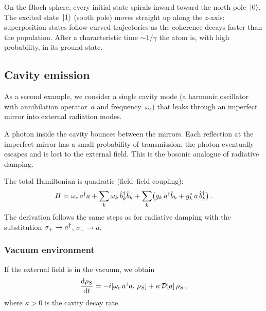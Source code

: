 \begin{intuition}
  On the Bloch sphere, every initial state spirals inward toward the
  north pole~$\lvert 0 \rangle$.  The excited state~$\lvert 1 \rangle$ (south pole)
  moves straight up along the $z$-axis; superposition states follow
  curved trajectories as the coherence decays faster than the
  population.  After a characteristic time $\sim 1/\gamma$ the atom
  is, with high probability, in its ground state.
\end{intuition}

\subsection{Cavity emission}%
\label{sec:cavity-emission}

As a second example, we consider a single cavity mode (a harmonic
oscillator with annihilation operator~$a$ and frequency~$\omega_c$)
that leaks through an imperfect mirror into external radiation modes.

\begin{intuition}
  A photon inside the cavity bounces between the mirrors.  Each
  reflection at the imperfect mirror has a small probability of
  transmission; the photon eventually escapes and is lost to the
  external field.  This is the bosonic analogue of radiative damping.
\end{intuition}

The total Hamiltonian is quadratic (field--field coupling):
\begin{equation}\label{eq:cavity-hamiltonian}
  H = \omega_c\, a^\dagger a
    + \sum_k \omega_k\, \hat{b}_k^\dagger \hat{b}_k
    + \sum_k \bigl(g_k\, a^\dagger \hat{b}_k + g_k^*\, a\, \hat{b}_k^\dagger\bigr)\,.
\end{equation}
The derivation follows the same steps as for radiative damping with
the substitution $\sigma_+ \to a^\dagger$, $\sigma_- \to a$.

\subsubsection{Vacuum environment}

If the external field is in the vacuum, we obtain
\begin{equation}\label{eq:lindblad-cavity-vac}
  \frac{\mathrm{d}\rho_S}{\mathrm{d} t}
  = -i[\omega_c\, a^\dagger a,\,\rho_S]
    + \kappa\,\mathcal{D}[a]\,\rho_S\,,
\end{equation}
where $\kappa > 0$ is the cavity decay rate.

